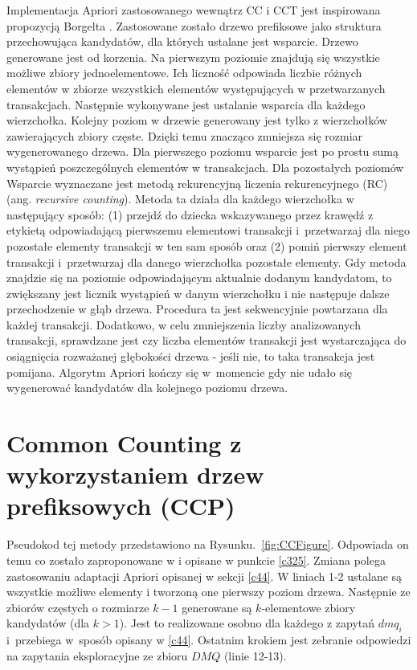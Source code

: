 Implementacja Apriori zastosowanego wewnątrz CC i CCT jest inspirowana propozycją Borgelta \cite{Borgelt}. Zastosowane zostało drzewo prefiksowe jako struktura przechowująca kandydatów, dla których ustalane jest wsparcie. Drzewo generowane jest od korzenia. Na pierwszym poziomie znajdują się wszystkie możliwe zbiory jednoelementowe. Ich liczność odpowiada liczbie różnych elementów w zbiorze wszystkich elementów występujących w przetwarzanych transakcjach. Następnie wykonywane jest ustalanie wsparcia dla każdego wierzchołka. Kolejny poziom w drzewie generowany jest tylko z wierzchołków zawierających zbiory częste. Dzięki temu znacząco zmniejsza się rozmiar wygenerowanego drzewa. Dla pierwszego poziomu wsparcie jest po prostu sumą wystąpień poszczególnych elementów w transakcjach. Dla pozostałych poziomów Wsparcie wyznaczane jest metodą rekurencyjną liczenia rekurencyjnego (RC) (ang. \textit{recursive counting}). Metoda ta działa dla każdego wierzchołka w następujący sposób: (1) przejdź do dziecka wskazywanego przez krawędź z etykietą odpowiadającą pierwszemu elementowi transakcji i~przetwarzaj dla niego pozostałe elementy transakcji w ten sam sposób oraz (2) pomiń pierwszy element transakcji i~przetwarzaj dla danego wierzchołka pozostałe elementy. Gdy metoda znajdzie się na poziomie odpowiadającym aktualnie dodanym kandydatom, to zwiększany jest licznik wystąpień w danym wierzchołku i nie następuje dalsze przechodzenie w głąb drzewa. Procedura ta jest sekwencyjnie powtarzana dla każdej transakcji. Dodatkowo, w celu zmniejszenia liczby analizowanych transakcji, sprawdzane jest czy liczba elementów transakcji jest wystarczająca do osiągnięcia rozważanej głębokości drzewa - jeśli nie, to taka transakcja jest pomijana. Algorytm Apriori kończy się w~momencie gdy nie udało się wygenerować kandydatów dla kolejnego poziomu drzewa.

\section{Common Counting z wykorzystaniem drzew prefiksowych (CCP)}
\label{c45}
Pseudokod tej metody przedstawiono na Rysunku.~\ref{fig:CCFigure}. Odpowiada on temu co zostało zaproponowane w \cite{WojciechowskiCC} i opisane w punkcie \ref{c325}. Zmiana polega zastosowaniu adaptacji Apriori opisanej w sekcji \ref{c44}. W liniach 1-2 ustalane są wszystkie możliwe elementy i tworzoną one pierwszy poziom drzewa. Następnie ze zbiorów częstych o rozmiarze \(k-1\) generowane są \(k\)-elementowe zbiory kandydatów (dla \(k > 1\)). Jest to realizowane osobno dla każdego z zapytań \(dmq_i\) i~przebiega w~sposób opisany w \ref{c44}. Ostatnim krokiem jest zebranie odpowiedzi na zapytania eksploracyjne ze zbioru \(DMQ\) (linie 12-13). 

